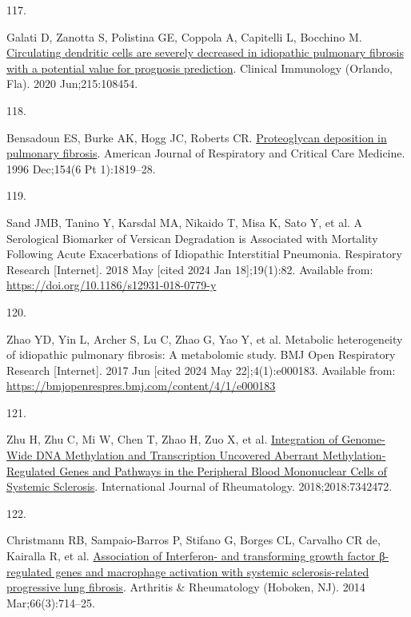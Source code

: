 \documentclass[
]{article}
\newlength{\cslhangindent}
\newlength{\csllabelwidth}
\newlength{\cslentryspacingunit} %
\newenvironment{CSLReferences}[2] %
 {%
  \setlength{\parindent}{0pt}
  \ifodd #1
  \let\oldpar\par
  \def\par{\hangindent=\cslhangindent\oldpar}
  \fi
  \setlength{\parskip}{#2\cslentryspacingunit}
 }%
 {}
\newcommand{\CSLLeftMargin}[1]{\parbox[t]{\csllabelwidth}{#1}}
\newcommand{\CSLRightInline}[1]{\parbox[t]{\linewidth - \csllabelwidth}{#1}\break}
\begin{document}
\begin{CSLReferences}{0}{0}
\leavevmode{}%
\CSLLeftMargin{117. }%
\CSLRightInline{Galati D, Zanotta S, Polistina GE, Coppola A, Capitelli L, Bocchino M. \href{https://doi.org/10.1016/j.clim.2020.108454}{Circulating dendritic cells are severely decreased in idiopathic pulmonary fibrosis with a potential value for prognosis prediction}. Clinical Immunology (Orlando, Fla). 2020 Jun;215:108454. }

\leavevmode{}%
\CSLLeftMargin{118. }%
\CSLRightInline{Bensadoun ES, Burke AK, Hogg JC, Roberts CR. \href{https://doi.org/10.1164/ajrccm.154.6.8970376}{Proteoglycan deposition in pulmonary fibrosis}. American Journal of Respiratory and Critical Care Medicine. 1996 Dec;154(6 Pt 1):1819--28. }

\leavevmode{}%
\CSLLeftMargin{119. }%
\CSLRightInline{Sand JMB, Tanino Y, Karsdal MA, Nikaido T, Misa K, Sato Y, et al. A {Serological} {Biomarker} of {Versican} {Degradation} is {Associated} with {Mortality} {Following} {Acute} {Exacerbations} of {Idiopathic} {Interstitial} {Pneumonia}. Respiratory Research {[}Internet{]}. 2018 May {[}cited 2024 Jan 18{]};19(1):82. Available from: \url{https://doi.org/10.1186/s12931-018-0779-y}}

\leavevmode{}%
\CSLLeftMargin{120. }%
\CSLRightInline{Zhao YD, Yin L, Archer S, Lu C, Zhao G, Yao Y, et al. Metabolic heterogeneity of idiopathic pulmonary fibrosis: A metabolomic study. BMJ Open Respiratory Research {[}Internet{]}. 2017 Jun {[}cited 2024 May 22{]};4(1):e000183. Available from: \url{https://bmjopenrespres.bmj.com/content/4/1/e000183}}

\leavevmode{}%
\CSLLeftMargin{121. }%
\CSLRightInline{Zhu H, Zhu C, Mi W, Chen T, Zhao H, Zuo X, et al. \href{https://doi.org/10.1155/2018/7342472}{Integration of {Genome}-{Wide} {DNA} {Methylation} and {Transcription} {Uncovered} {Aberrant} {Methylation}-{Regulated} {Genes} and {Pathways} in the {Peripheral} {Blood} {Mononuclear} {Cells} of {Systemic} {Sclerosis}}. International Journal of Rheumatology. 2018;2018:7342472. }

\leavevmode{}%
\CSLLeftMargin{122. }%
\CSLRightInline{Christmann RB, Sampaio-Barros P, Stifano G, Borges CL, Carvalho CR de, Kairalla R, et al. \href{https://doi.org/10.1002/art.38288}{Association of {Interferon}- and transforming growth factor β-regulated genes and macrophage activation with systemic sclerosis-related progressive lung fibrosis}. Arthritis \& Rheumatology (Hoboken, NJ). 2014 Mar;66(3):714--25. }


\end{CSLReferences}
\end{document}
